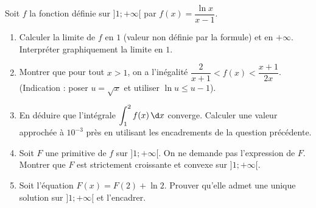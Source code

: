 \documentclass[11pt]{article}
\begin{document}
\begin{exercice}
Soit $f$ la fonction définie sur $]1; +\infty[$ par $f(x) = \dfrac{\ln x}{x-1}$.
\begin{enumerate}
    \item Calculer la limite de $f$ en $1$ (valeur non définie par la formule) et en $+\infty$. Interpréter graphiquement la limite en $1$.
    \item Montrer que pour tout $x > 1$, on a l'inégalité $\dfrac{2}{x+1} < f(x) < \dfrac{x+1}{2x}$. (Indication : poser $u = \sqrt{x}$ et utiliser $\ln u \leq u-1$).
    \item En déduire que l'intégrale $\displaystyle\int_1^2 f(x)\,\d x$ converge. Calculer une valeur approchée à $10^{-3}$ près en utilisant les encadrements de la question précédente.
    \item Soit $F$ une primitive de $f$ sur $]1; +\infty[$. On ne demande pas l'expression de $F$. Montrer que $F$ est strictement croissante et convexe sur $]1; +\infty[$.
    \item Soit l'équation $F(x) = F(2) + \ln 2$. Prouver qu'elle admet une unique solution sur $]1; +\infty[$ et l'encadrer.
\end{enumerate}
\end{exercice}
\end{document}
